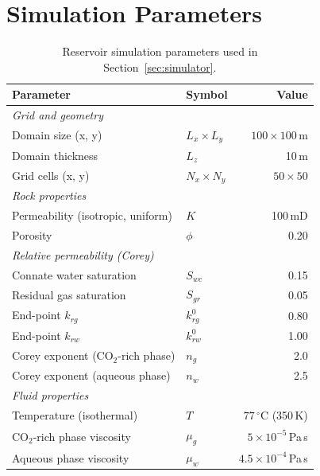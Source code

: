 \documentclass[preprint,12pt,authoryear]{elsarticle}
\begin{document}
\section{Simulation Parameters}
\label{sec:sim_table}

\begin{table}[H]
  \centering
  \caption{Reservoir simulation parameters used in Section~\ref{sec:simulator}.}
  \label{tab:sim_setup}
  \begin{tabular}{llr}
    \toprule
    Parameter & Symbol & Value \\
    \midrule
    \multicolumn{3}{l}{\textit{Grid and geometry}} \\
    Domain size (x, y)                 & $L_x \times L_y$ & $100 \times 100$\,m \\
    Domain thickness                   & $L_z$            & 10\,m \\
    Grid cells (x, y)                  & $N_x \times N_y$ & $50 \times 50$ \\
    \midrule
    \multicolumn{3}{l}{\textit{Rock properties}} \\
    Permeability (isotropic, uniform)  & $K$              & 100\,mD \\
    Porosity                           & $\phi$           & 0.20 \\
    \midrule
    \multicolumn{3}{l}{\textit{Relative permeability (Corey)}} \\
    Connate water saturation           & $S_{wc}$         & 0.15 \\
    Residual gas saturation            & $S_{gr}$         & 0.05 \\
    End-point $k_{rg}$                 & $k_{rg}^0$       & 0.80 \\
    End-point $k_{rw}$                 & $k_{rw}^0$       & 1.00 \\
    Corey exponent (CO$_2$-rich phase) & $n_g$            & 2.0  \\
    Corey exponent (aqueous phase)     & $n_w$            & 2.5  \\
    \midrule
    \multicolumn{3}{l}{\textit{Fluid properties}} \\
    Temperature (isothermal)           & $T$              & $77\,^\circ$C (350\,K) \\
    CO$_2$-rich phase viscosity        & $\mu_g$          & $5\times10^{-5}$\,Pa\,s \\
    Aqueous phase viscosity            & $\mu_w$          & $4.5\times10^{-4}$\,Pa\,s \\

\end{tabular}
\end{table}
\end{document}
